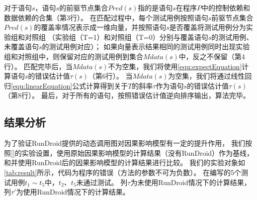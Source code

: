 对于语句$s$，语句$s$的前驱节点集合$Pred(s)$指的是语句$s$在程序$P$中的控制依赖和数据依赖的合集（第3行）。
在匹配过程中，每个测试用例按照语句$s$前驱节点集合$Pred(s)$的覆盖率情况表示成一维向量，并按照语句$s$是否覆盖将测试用例分为实验组和对照组
（实验组（T=1）和对照组（T=0）分别与覆盖语句$s$的测试用例、未覆盖语句$s$的测试用例对应）；
如果向量表示结果相同的测试用例同时出现实验组和对照组中，则保留对应的测试用例到集合$Mdata(s)$中，反之不保留（第4行）。
匹配完毕后，当$Mdata(s)$不为空集，我们将使用\autoref{equ:expectEquation}计算语句$s$的错误估计值$\tau(s)$（第6行）。
当$Mdata(s)$为空集，我们将通过线性回归\autoref{equ:linearEquation}公式计算得到关于$T$的斜率$\tau$作为语句$s$的错误估计值$\tau(s)$（第8行）。
最后，对于所有的语句，按照错误估计值逆向排序输出，算法完毕。



\subsection{结果分析}


为了验证RunDroid提供的动态调用图对因果影响模型有一定的提升作用，
我们按照[]的实验设置，使用原始因果影响模型的计算结果（没有RunDroid）作为基线，和并使用RunDroid后的因果影响模型的计算结果进行比较。
我们的实验对象如\autoref{tab:result}所示，代码为程序的错误（方法的参数不可为负数）。
在编写的5个测试用例$t_1\sim t_5$中，$t_2$、$ t_5$未通过测试。
列$\tau$为未使用RunDroid情况下的计算结果，列$\tau'$为使用RunDroid情况下的计算结果。

